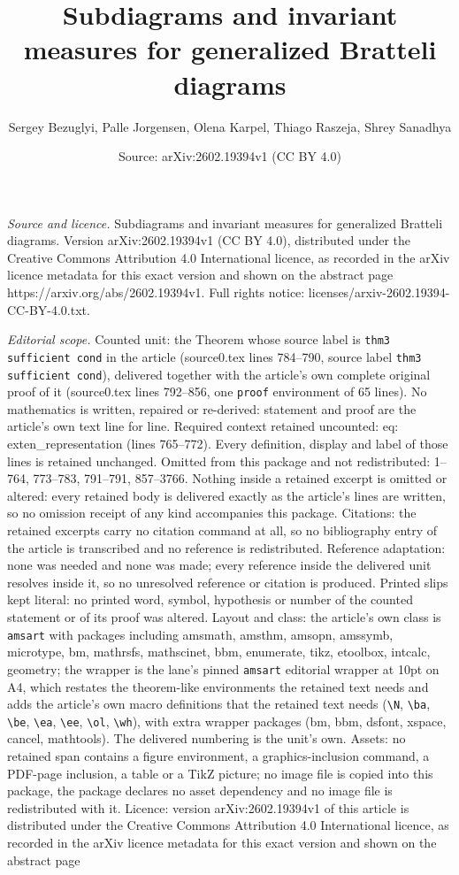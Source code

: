 \documentclass[10pt,a4paper]{amsart}
\title[Subdiagrams and invariant measures for generalized Bratteli ]{Subdiagrams and invariant measures for generalized Bratteli diagrams}
\author{Sergey Bezuglyi, Palle Jorgensen, Olena Karpel, Thiago Raszeja, Shrey Sanadhya}
\date{Source: arXiv:2602.19394v1 (CC BY 4.0)}
\begin{document}
\maketitle

\noindent\emph{Source and licence.} Subdiagrams and invariant measures for generalized Bratteli diagrams. Version arXiv:2602.19394v1 (CC BY 4.0), distributed under the Creative Commons Attribution 4.0 International licence, as recorded in the arXiv licence metadata for this exact version and shown on the abstract page https://arxiv.org/abs/2602.19394v1. Full rights notice: licenses/arxiv-2602.19394-CC-BY-4.0.txt.\par\smallskip

\noindent\textit{Editorial scope.} Counted unit: the Theorem whose source label is \texttt{thm3 sufficient cond} in the article (source0.tex lines 784--790, source label \texttt{thm3 sufficient cond}), delivered together with the article's own complete original proof of it (source0.tex lines 792--856, one \texttt{proof} environment of 65 lines). No mathematics is written, repaired or re-derived: statement and proof are the article's own text line for line. Required context retained uncounted: eq: exten\_representation (lines 765--772). Every definition, display and label of those lines is retained unchanged. Omitted from this package and not redistributed: 1--764, 773--783, 791--791, 857--3766. Nothing inside a retained excerpt is omitted or altered: every retained body is delivered exactly as the article's lines are written, so no omission receipt of any kind accompanies this package. Citations: the retained excerpts carry no citation command at all, so no bibliography entry of the article is transcribed and no reference is redistributed. Reference adaptation: none was needed and none was made; every reference inside the delivered unit resolves inside it, so no unresolved reference or citation is produced. Printed slips kept literal: no printed word, symbol, hypothesis or number of the counted statement or of its proof was altered. Layout and class: the article's own class is \texttt{amsart} with packages including amsmath, amsthm, amsopn, amssymb, microtype, bm, mathrsfs, mathscinet, bbm, enumerate, tikz, etoolbox, intcalc, geometry; the wrapper is the lane's pinned \texttt{amsart} editorial wrapper at 10pt on A4, which restates the theorem-like environments the retained text needs and adds the article's own macro definitions that the retained text needs (\texttt{\textbackslash N}, \texttt{\textbackslash ba}, \texttt{\textbackslash be}, \texttt{\textbackslash ea}, \texttt{\textbackslash ee}, \texttt{\textbackslash ol}, \texttt{\textbackslash wh}), with extra wrapper packages (bm, bbm, dsfont, xspace, cancel, mathtools). The delivered numbering is the unit's own. Assets: no retained span contains a figure environment, a graphics-inclusion command, a PDF-page inclusion, a table or a TikZ picture; no image file is copied into this package, the package declares no asset dependency and no image file is redistributed with it. Licence: version arXiv:2602.19394v1 of this article is distributed under the Creative Commons Attribution 4.0 International licence, as recorded in the arXiv licence metadata for this exact version and shown on the abstract page 
\end{document}
